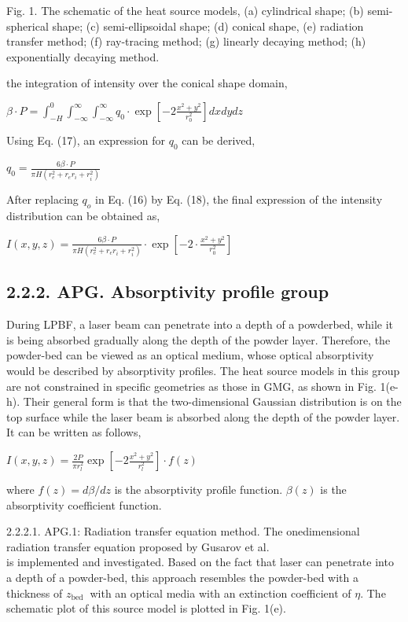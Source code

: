 \documentclass[10pt]{article}
\begin{document}
Fig. 1. The schematic of the heat source models, (a) cylindrical shape; (b) semi-spherical shape; (c) semi-ellipsoidal shape; (d) conical shape, (e) radiation transfer method; (f) ray-tracing method; (g) linearly decaying method; (h) exponentially decaying method.

the integration of intensity over the conical shape domain,

$\beta \cdot P=\int_{-H}^{0} \int_{-\infty}^{\infty} \int_{-\infty}^{\infty} q_{0} \cdot \exp \left[-2 \frac{x^{2}+y^{2}}{r_{0}^{2}}\right] d x d y d z$

Using Eq. (17), an expression for $q_{0}$ can be derived,

$q_{0}=\frac{6 \beta \cdot P}{\pi H\left(r_{e}^{2}+r_{e} r_{i}+r_{i}^{2}\right)}$

After replacing $q_{o}$ in Eq. (16) by Eq. (18), the final expression of the intensity distribution can be obtained as,

$I(x, y, z)=\frac{6 \beta \cdot P}{\pi H\left(r_{e}^{2}+r_{e} r_{i}+r_{i}^{2}\right)} \cdot \exp \left[-2 \cdot \frac{x^{2}+y^{2}}{r_{0}^{2}}\right]$

\subsection*{2.2.2. APG. Absorptivity profile group}
During LPBF, a laser beam can penetrate into a depth of a powderbed, while it is being absorbed gradually along the depth of the powder layer. Therefore, the powder-bed can be viewed as an optical medium, whose optical absorptivity would be described by absorptivity profiles. The heat source models in this group are not constrained in specific geometries as those in GMG, as shown in Fig. 1(e-h). Their general form is that the two-dimensional Gaussian distribution is on the top surface while the laser beam is absorbed along the depth of the powder layer. It can be written as follows,

$I(x, y, z)=\frac{2 P}{\pi r_{l}^{2}} \exp \left[-2 \frac{x^{2}+y^{2}}{r_{l}^{2}}\right] \cdot f(z)$

where $f(z)=d \beta / d z$ is the absorptivity profile function. $\beta(z)$ is the absorptivity coefficient function.

2.2.2.1. APG.1: Radiation transfer equation method. The onedimensional radiation transfer equation proposed by Gusarov et al.\\
[6] is implemented and investigated. Based on the fact that laser can penetrate into a depth of a powder-bed, this approach resembles the powder-bed with a thickness of $z_{\text {bed }}$ with an optical media with an extinction coefficient of $\eta$. The schematic plot of this source model is plotted in Fig. 1(e).
\end{document}
